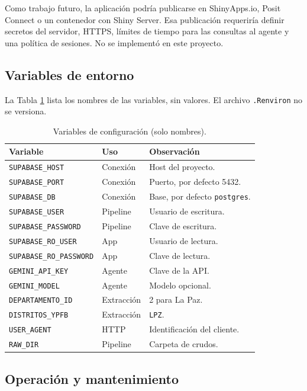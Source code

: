 \documentclass[12pt,a4paper]{article}
\begin{document}
Como trabajo futuro, la aplicación podría publicarse en ShinyApps.io, Posit Connect o un contenedor con Shiny Server. Esa publicación requeriría definir secretos del servidor, HTTPS, límites de tiempo para las consultas al agente y una política de sesiones. No se implementó en este proyecto.

\subsection{Variables de entorno}

La Tabla \ref{tab:env} lista los nombres de las variables, sin valores. El archivo \texttt{.Renviron} no se versiona.

\begin{table}[H]
\centering
\small
\caption{Variables de configuración (solo nombres).}
\label{tab:env}
\begin{tabularx}{\linewidth}{@{}l l X@{}}
\toprule
\textbf{Variable} & \textbf{Uso} & \textbf{Observación} \\
\midrule
\texttt{SUPABASE\_HOST} & Conexión & Host del proyecto. \\
\texttt{SUPABASE\_PORT} & Conexión & Puerto, por defecto 5432. \\
\texttt{SUPABASE\_DB} & Conexión & Base, por defecto \texttt{postgres}. \\
\texttt{SUPABASE\_USER} & Pipeline & Usuario de escritura. \\
\texttt{SUPABASE\_PASSWORD} & Pipeline & Clave de escritura. \\
\texttt{SUPABASE\_RO\_USER} & App & Usuario de lectura. \\
\texttt{SUPABASE\_RO\_PASSWORD} & App & Clave de lectura. \\
\texttt{GEMINI\_API\_KEY} & Agente & Clave de la API. \\
\texttt{GEMINI\_MODEL} & Agente & Modelo opcional. \\
\texttt{DEPARTAMENTO\_ID} & Extracción & 2 para La Paz. \\
\texttt{DISTRITOS\_YPFB} & Extracción & \texttt{LPZ}. \\
\texttt{USER\_AGENT} & HTTP & Identificación del cliente. \\
\texttt{RAW\_DIR} & Pipeline & Carpeta de crudos. \\
\bottomrule
\end{tabularx}
\end{table}

\subsection{Operación y mantenimiento}
\end{document}
